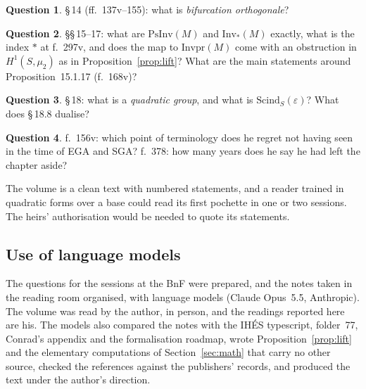 \documentclass[11pt,a4paper]{amsart}
\theoremstyle{plain}
\theoremstyle{definition}
\newtheorem{question}{Question}
\begin{document}
\begin{question}
\S\,14 (ff.~137v--155): what is \emph{bifurcation orthogonale}?
\end{question}

\begin{question}
\S\S\,15--17: what are $\mathrm{PsInv}(M)$ and $\mathrm{Inv}_*(M)$ exactly, what is the index $*$ at f.~297v, and does the map to $\mathrm{Invpr}(M)$ come with an obstruction in $H^1(S,\mu_2)$ as in Proposition~\ref{prop:lift}? What are the main statements around Proposition~15.1.17 (f.~168v)?
\end{question}

\begin{question}\label{qu:quadgroups}
\S\,18: what is a \emph{quadratic group}, and what is $\mathrm{Scind}_S(\varepsilon)$? What does \S\,18.8 dualise?
\end{question}

\begin{question}
f.~156v: which point of terminology does he regret not having seen in the time of EGA and SGA? f.~378: how many years does he say he had left the chapter aside?
\end{question}

The volume is a clean text with numbered statements, and a reader trained in quadratic forms over a base could read its first pochette in one or two sessions. The heirs' authorisation would be needed to quote its statements.

\subsection*{Use of language models}
The questions for the sessions at the BnF were prepared, and the notes taken in the reading room organised, with language models (Claude Opus~5.5, Anthropic). The volume was read by the author, in person, and the readings reported here are his. The models also compared the notes with the IHÉS typescript, folder~77, Conrad's appendix and the formalisation roadmap, wrote Proposition~\ref{prop:lift} and the elementary computations of Section~\ref{sec:math} that carry no other source, checked the references against the publishers' records, and produced the text under the author's direction.
\end{document}
